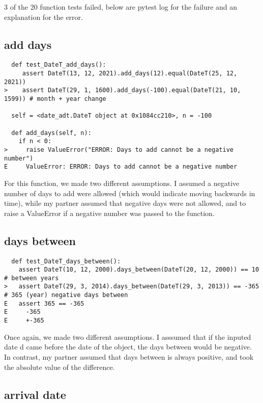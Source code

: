 \documentclass[12pt]{article}
\begin{document}
3 of the 20 function tests failed, below are pytest log for the failure and an explanation for the error.

\subsection{add days}

\begin{lstlisting}
  def test_DateT_add_days():
     assert DateT(13, 12, 2021).add_days(12).equal(DateT(25, 12, 2021))
>    assert DateT(29, 1, 1600).add_days(-100).equal(DateT(21, 10, 1599)) # month + year change

  self = <date_adt.DateT object at 0x1084cc210>, n = -100

  def add_days(self, n):
    if n < 0:
>     raise ValueError("ERROR: Days to add cannot be a negative number")
E     ValueError: ERROR: Days to add cannot be a negative number
\end{lstlisting}

For this function, we made two different assumptions. I assumed a negative number of days to add were allowed (which would indicate moving backwards in time), while my partner assumed that negative days were not allowed, and to raise a ValueError if a negative number was passed to the function.
\\

\subsection{days between}

\begin{lstlisting}
  def test_DateT_days_between():
    assert DateT(10, 12, 2000).days_between(DateT(20, 12, 2000)) == 10 # between years
>   assert DateT(29, 3, 2014).days_between(DateT(29, 3, 2013)) == -365 # 365 (year) negative days between
E   assert 365 == -365
E     -365
E     +-365
\end{lstlisting}

Once again, we made two different assumptions. I asssumed that if the inputed date d came before the date of the object, the days between would be negative. In contrast, my partner assumed that days between is always positive, and took the absolute value of the difference.
\\

\subsection{arrival date}
\end{document}
